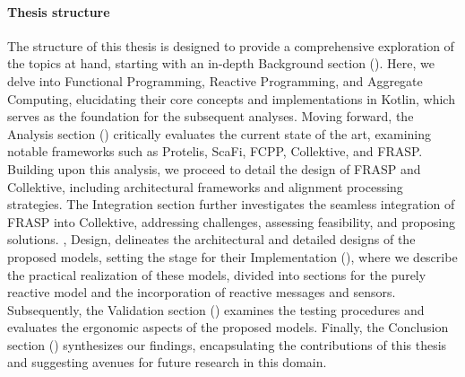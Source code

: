 \paragraph{Thesis structure}

The structure of this thesis is designed to provide a comprehensive exploration of the topics at hand, starting with an in-depth Background section (). Here, we delve into Functional Programming, Reactive Programming, and Aggregate Computing, elucidating their core concepts and implementations in Kotlin, which serves as the foundation for the subsequent analyses. Moving forward, the Analysis section () critically evaluates the current state of the art, examining notable frameworks such as Protelis, ScaFi, FCPP, Collektive, and FRASP. Building upon this analysis, we proceed to detail the design of FRASP and Collektive, including architectural frameworks and alignment processing strategies. The Integration section further investigates the seamless integration of FRASP into Collektive, addressing challenges, assessing feasibility, and proposing solutions. , Design, delineates the architectural and detailed designs of the proposed models, setting the stage for their Implementation (), where we describe the practical realization of these models, divided into sections for the purely reactive model and the incorporation of reactive messages and sensors. Subsequently, the Validation section () examines the testing procedures and evaluates the ergonomic aspects of the proposed models. Finally, the Conclusion section () synthesizes our findings, encapsulating the contributions of this thesis and suggesting avenues for future research in this domain.

